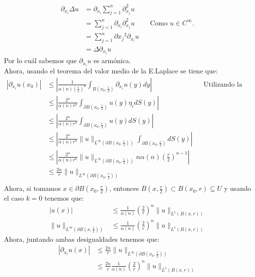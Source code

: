 \begin{homeworkProblem}
\begin{solucion}
\begin{itemize}
\begin{align*}
          \partial_{x_i}\Delta u&=\partial_{x_i}\sum_{j=1}^n\partial_{x_j}^2u\\
          &=\sum_{j=1}^{n}\partial_{x_i}\partial_{x_j}^2u &&\text{Como $u\in C^{\infty}$.}\\
          &=\sum_{j=1}^{n}\partial{x_j}^2\partial_{x_i}u\\
          &=\Delta \partial_{x_i} u
        \end{align*}
        Por lo cuál sabemos que $\partial_{x_i}u$ es armónica.\\
        Ahora, usando el teorema del valor medio de la E.Laplace se tiene que:
        \begin{align*}
          |\partial_{x_i}u(x_0)|&\leq \left| \frac{1}{\alpha(n)\left( \frac{r}{2} \right)^n}\int_{B(x_0,\frac{r}{2})}\partial_{x_i}u(y)dy \right| &&\text{Utilizando la formula de integración por partes.}\\
          &\leq \left| \frac{2^n}{\alpha(n)r^n}\int_{\partial B(x_0,\frac{r}{2})} u(y)\eta_i dS(y) \right|\\
          &\leq \left| \frac{2^n}{\alpha(n)r^n}\int_{\partial B(x_0,\frac{r}{2})} u(y)dS(y) \right|\\
          &\leq \left| \frac{2^n}{\alpha(n)r^n}\|u\|_{L^{\infty}(\partial B(x_0,\frac{r}{2}))}\int_{\partial B(x_0,\frac{r}{2})}dS(y) \right|\\
          &\leq \left| \frac{2^n}{\alpha(n)r^n}\|u\|_{L^{\infty}(\partial B(x_0,\frac{r}{2}))}n\alpha(n)\left( \frac{r}{2} \right)^{n-1} \right|\\
          &\leq \frac{2n}{r}\|u\|_{L^{\infty}(\partial B(x_0,\frac{r}{2}))}\\
        \end{align*}
        Ahora, si tomamos $x\in \partial B(x_0,\frac{r}{2})$, entonces $B(x,\frac{r}{2})\subset B(x_0,r)\subseteq U$ y usando el caso $k=0$ tenemos que:
        \begin{align*}
          |u(x)|&\leq\frac{1}{\alpha(n)}\left( \frac{2}{r} \right)^{n}\|u\|_{L^1(B(x,r))}\\
          \|u\|_{L^{\infty}(\partial B(x,\frac{r}{2}))}&\leq \frac{1}{\alpha(n)}\left( \frac{2}{r} \right)^{n}\|u\|_{L^1(B(x,r))}
        \end{align*}
        Ahora, juntando ambas desigualdades tenemos que:
        \begin{align}
          |\partial_{x_i}u(x)|&\leq \frac{2n}{r}\|u\|_{L^{\infty}(\partial B(x_0,\frac{r}{2}))}\\
          &\leq \frac{2n}{r}\frac{1}{\alpha(n)}\left( \frac{2}{r} \right)^{n}\|u\|_{L^{1}(B(x,r))}\\

\end{align}
\end{itemize}
\end{solucion}
\end{homeworkProblem}
